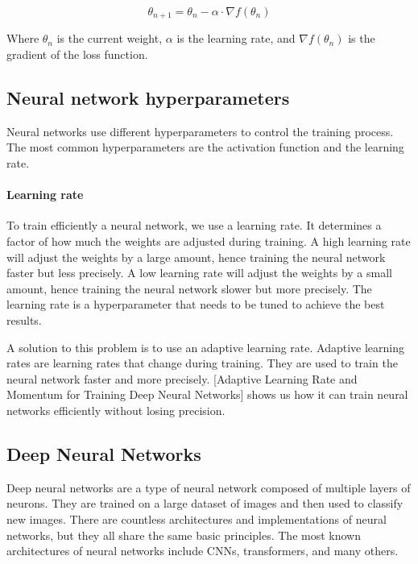 \begin{equation}
    \theta_{n+1} = \theta_{n} - \alpha \cdot \nabla f(\theta_{n})
\end{equation}

Where $\theta_{n}$ is the current weight, $\alpha$ is the learning rate, and $\nabla f(\theta_{n})$ is the gradient of the loss function.

\subsection{Neural network hyperparameters}
Neural networks use different hyperparameters to control the training process. The most common hyperparameters are the activation function and the learning rate.


\paragraph{Learning rate}

To train efficiently a neural network, we use a learning rate. It determines a factor of how much the weights are adjusted during training. A high learning rate will adjust the weights by a large amount, hence training the neural network faster but less precisely. A low learning rate will adjust the weights by a small amount, hence training the neural network slower but more precisely. The learning rate is a hyperparameter that needs to be tuned to achieve the best results.

A solution to this problem is to use an adaptive learning rate. Adaptive learning rates are learning rates that change during training. They are used to train the neural network faster and more precisely. [Adaptive Learning Rate and Momentum for Training Deep Neural Networks]\cite{hao2021adaptive} shows us how it can train neural networks efficiently without losing precision. 

\subsection{Deep Neural Networks}

Deep neural networks are a type of neural network composed of multiple layers of neurons\cite{Schmidhuber_2015}. They are trained on a large dataset of images and then used to classify new images. There are countless architectures \cite{LIU201711} and implementations of neural networks, but they all share the same basic principles. The most known architectures of neural networks include CNNs\cite{oshea2015introduction}, transformers\cite{vaswani2017attention}, and many others.


